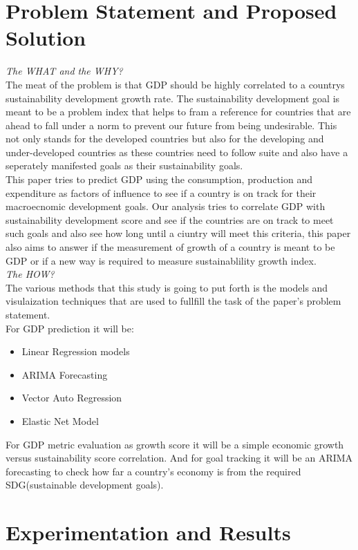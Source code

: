 \documentclass[conference]{IEEEtran}
\begin{document}
\section{Problem Statement and Proposed Solution}
\emph{The WHAT and the WHY?}\\
The meat of the problem is that GDP should be highly correlated to a countrys sustainability development growth rate.
The sustainability development goal is meant to be a problem index that helps to fram a reference for countries that are ahead to fall under a norm to prevent our future from being undesirable.
This not only stands for the developed countries but also for the developing and under-developed countries as these countries need to follow suite and also have a seperately manifested goals as their sustainability goals.\\
This paper tries to predict GDP using the consumption, production and expenditure as factors of influence to see if a country is on track for their macroecnomic development goals.
Our analysis tries to correlate GDP with sustainability development score and see if the countries are on track to meet such goals and also see how long until a ciuntry will meet this criteria, this paper also aims to answer if the measurement of growth of a country is meant to be GDP or if a new way is required to measure sustainablility growth index.
\bigskip\\
\emph{The HOW?}\\
The various methods that this study is going to put forth is the models and visulaization techniques that are used to fullfill the task of the paper's problem statement.
\\For GDP prediction it will be:\\
\begin{itemize}
    \item Linear Regression models
    \item ARIMA Forecasting
    \item Vector Auto Regression
    \item Elastic Net Model
\end{itemize}
For GDP metric evaluation as growth score it will be a simple economic growth versus sustainability score correlation.
And for goal tracking it will be an ARIMA forecasting to check how far a country's economy is from the required SDG(sustainable development goals).

\bigskip
\section{Experimentation and Results}
\end{document}
